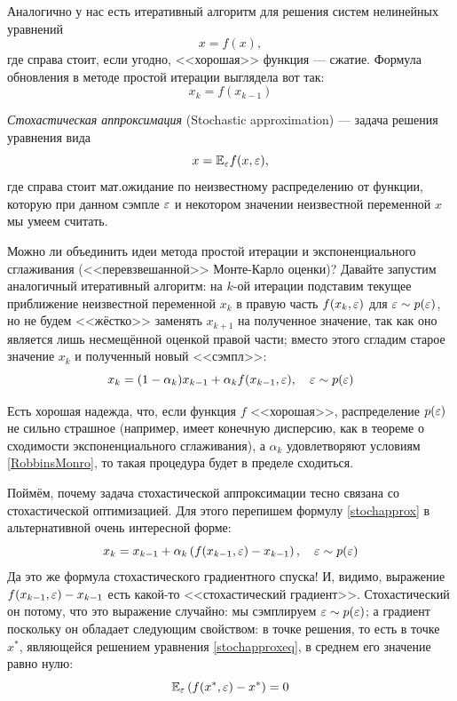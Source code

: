 Аналогично у нас есть итеративный алгоритм для решения систем нелинейных уравнений
$$x = f(x),$$
где справа стоит, если угодно, <<хорошая>> функция --- сжатие. Формула обновления в методе простой итерации выглядела вот так:
$$x_k = f(x_{k-1})$$

\begin{definition}
\emph{Стохастическая аппроксимация} (Stochastic approximation) --- задача решения уравнения вида
\begin{equation}\label{stochapproxeq}
x = \mathbb{E}_{\varepsilon} f(x, \varepsilon),
\end{equation}
где справа стоит мат.ожидание по неизвестному распределению от функции, которую при данном сэмпле $\varepsilon$ и некотором значении неизвестной переменной $x$ мы умеем считать. 
\end{definition}

Можно ли объединить идеи метода простой итерации и экспоненциального сглаживания (<<перевзвешанной>> Монте-Карло оценки)? Давайте запустим аналогичный итеративный алгоритм: на $k$-ой итерации подставим текущее приближение неизвестной переменной $x_k$ в правую часть $f(x_k, \varepsilon)$ для $\varepsilon \sim p(\varepsilon)$, но не будем <<жёстко>> заменять $x_{k+1}$ на полученное значение, так как оно является лишь несмещённой оценкой правой части; вместо этого сгладим старое значение $x_k$ и полученный новый <<сэмпл>>:
\begin{equation}\label{stochapprox}
x_k = (1 - \alpha_k)x_{k-1} + \alpha_k f(x_{k-1}, \varepsilon), \quad \varepsilon \sim p(\varepsilon)
\end{equation}

Есть хорошая надежда, что, если функция $f$ <<хорошая>>, распределение $p(\varepsilon)$ не сильно страшное (например, имеет конечную дисперсию, как в теореме о сходимости экспоненциального сглаживания), а $\alpha_k$ удовлетворяют условиям \eqref{RobbinsMonro}, то такая процедура будет в пределе сходиться.

Поймём, почему задача стохастической аппроксимации тесно связана со стохастической оптимизацией. Для этого перепишем формулу \eqref{stochapprox} в альтернативной очень интересной форме:
\begin{equation}\label{stochapproxgrad}
x_k = x_{k-1} + \alpha_k \left( f(x_{k-1}, \varepsilon) - x_{k-1} \right), \quad \varepsilon \sim p(\varepsilon)
\end{equation}
Да это же формула стохастического градиентного спуска! И, видимо, выражение $f(x_{k-1}, \eps) \HM- x_{k-1}$ есть какой-то <<стохастический градиент>>. Стохастический он потому, что это выражение случайно: мы сэмплируем $\varepsilon \sim p(\varepsilon)$; а градиент поскольку он обладает следующим свойством: в точке решения, то есть в точке $x^*$, являющейся решением уравнения \eqref{stochapproxeq}, в среднем его значение равно нулю: 
$$\mathbb{E}_{\varepsilon} \left( f(x^*, \varepsilon) - x^* \right) = 0$$


